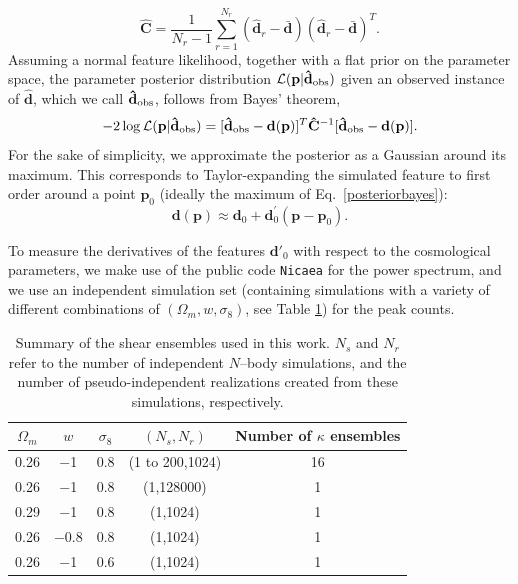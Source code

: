 \documentclass[reprint,aps,prd,superscriptaddress,showkeys,showpacs]{revtex4-1}
\newcommand{\bb}[1]{\mathbf{#1}}
\newcommand{\bbh}[1]{\mathbf{\hat{#1}}}
\begin{document}
\begin{equation}
\label{covest}
\bbh{C} = \frac{1}{N_r-1}\sum_{r=1}^{N_r} (\bbh{d}_r - \bar{\bb{d}}) (\bbh{d}_r - \bar{\bb{d}})^T.
\end{equation}
%
Assuming a normal feature likelihood, together with a flat prior on
the parameter space, the parameter posterior distribution
$\mathcal{L}(\bb{p}\vert\bbh{d}_{\rm obs})$ given an observed instance of
$\bbh{d}$, which we call $\bbh{d}_{\rm obs}$, follows from Bayes' theorem,
%
\begin{equation}
\label{posteriorbayes}
-2\log\mathcal{L}(\bb{p}\vert\bbh{d}_{\rm obs}) = [\bbh{d}_{\rm obs}-\bb{d}(\bb{p})]^T\bbh{C}^{-1}[\bbh{d}_{\rm obs}-\bb{d}(\bb{p})].
\end{equation}
%
For the sake of simplicity, we approximate the posterior as a Gaussian
around its maximum. This corresponds to Taylor-expanding the simulated
feature to first order around a point $\bb{p}_0$ (ideally the maximum
of Eq.~\ref{posteriorbayes}):
%
\begin{equation}
\bb{d}(\bb{p}) \approx \bb{d}_0 + \bb{d}_0^\prime(\bb{p}-\bb{p}_0).
\end{equation}
%

To measure the derivatives of the features $\bb{d}'_0$ with respect to
the cosmological parameters, we make use of the public code
\texttt{Nicaea} \citep{Nicaea} for the power spectrum, and we use an
independent simulation set (containing simulations with a variety of
different combinations of $(\Omega_m,w,\sigma_8)$, see Table
\ref{simtable}) for the peak counts.

\begin{table}
\begin{center}
\begin{tabular}{c|c|c||c|c}
\toprule
$\Omega_m$ &  $w$ & $\sigma_8$ & $(N_s,N_r)$ & Number of $\kappa$ ensembles \\ \hline \hline
\midrule
%
0.26 & $-$1 & 0.8 & (1 to 200,1024) & 16 \\
0.26 & $-$1 & 0.8 & (1,128000) & 1 \\
0.29 & $-$1 & 0.8 & (1,1024) & 1 \\
0.26 & $-$0.8 & 0.8 & (1,1024) & 1 \\
0.26 & $-$1 & 0.6 & (1,1024) & 1 \\
%
\bottomrule
\end{tabular}
\end{center}
\caption{Summary of the shear ensembles used in this work. $N_s$ and
  $N_r$ refer to the number of independent $N$--body simulations, and the
  number of pseudo-independent realizations created from these
  simulations, respectively.}
\label{simtable}
\end{table}
\end{document}
